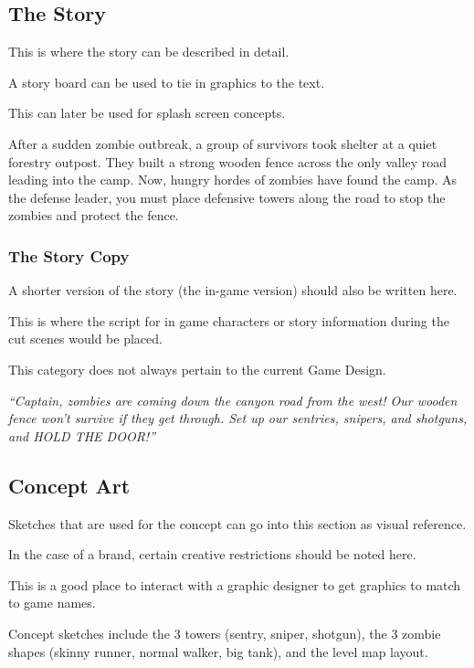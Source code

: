 \subsection{The Story}

\begin{guidance}
This is where the story can be described in detail.

A story board can be used to tie in graphics to the text.

This can later be used for splash screen concepts.
\end{guidance}
After a sudden zombie outbreak, a group of survivors took shelter at a quiet forestry outpost. They built a strong wooden fence across the only valley road leading into the camp. Now, hungry hordes of zombies have found the camp. As the defense leader, you must place defensive towers along the road to stop the zombies and protect the fence.

\subsubsection{The Story Copy}

\begin{guidance}
A shorter version of the story (the in-game version) should also be written here.

This is where the script for in game characters or story information during the cut scenes would be placed.

This category does not always pertain to the current Game Design.
\end{guidance}
\textit{``Captain, zombies are coming down the canyon road from the west! Our wooden fence won't survive if they get through. Set up our sentries, snipers, and shotguns, and HOLD THE DOOR!''}

\subsection{Concept Art}

\begin{guidance}
Sketches that are used for the concept can go into this section as visual reference.

In the case of a brand, certain creative restrictions should be noted here.

This is a good place to interact with a graphic designer to get graphics to match to game names.
\end{guidance}
Concept sketches include the 3 towers (sentry, sniper, shotgun), the 3 zombie shapes (skinny runner, normal walker, big tank), and the level map layout.

